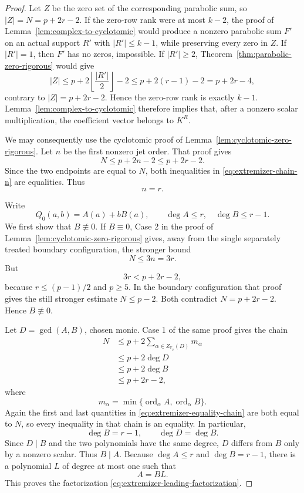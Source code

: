 \documentclass[11pt]{article}
\newcommand{\F}{\mathbb F}
\begin{document}
\begin{proof}
Let \(Z\) be the zero set of the corresponding parabolic sum, so
\(|Z|=N=p+2r-2\).  If the zero-row rank were at most \(k-2\), the proof
of Lemma~\ref{lem:complex-to-cyclotomic} would produce a nonzero
parabolic sum \(F'\) on an actual support \(R'\) with
\(|R'|\le k-1\), while preserving every zero in \(Z\).  If
\(|R'|=1\), then \(F'\) has no zeros, impossible.  If \(|R'|\ge2\),
Theorem~\ref{thm:parabolic-zero-rigorous} would give
\[
 |Z|
 \le
 p+2\left\lfloor\frac{|R'|}{2}\right\rfloor-2
 \le
 p+2(r-1)-2
 =p+2r-4,
\]
contrary to \(|Z|=p+2r-2\).  Hence the zero-row rank is exactly
\(k-1\).  Lemma~\ref{lem:complex-to-cyclotomic} therefore implies that,
after a nonzero scalar multiplication, the coefficient vector belongs
to \(K^R\).

We may consequently use the cyclotomic proof of
Lemma~\ref{lem:cyclotomic-zero-rigorous}.  Let \(n\) be the first
nonzero jet order.  That proof gives
\begin{equation}
 N\le p+2n-2
 \le p+2r-2.
 \label{eq:extremizer-chain-n}
\end{equation}
Since the two endpoints are equal to \(N\), both inequalities in
\eqref{eq:extremizer-chain-n} are equalities.  Thus
\begin{equation}
 n=r.
 \label{eq:extremizer-n-r}
\end{equation}

Write
\[
 Q_0(a,b)=A(a)+bB(a),
 \qquad
 \deg A\le r,
 \quad
 \deg B\le r-1.
\]
We first show that \(B\not\equiv0\).  If \(B\equiv0\), Case 2 in the
proof of Lemma~\ref{lem:cyclotomic-zero-rigorous} gives, away from the
single separately treated boundary configuration, the stronger bound
\[
 N\le3n=3r.
\]
But
\[
 3r<p+2r-2,
\]
because \(r\le(p-1)/2\) and \(p\ge5\).  In the boundary configuration
that proof gives the still stronger estimate \(N\le p-2\).  Both
contradict \(N=p+2r-2\).  Hence \(B\not\equiv0\).

Let \(D=\gcd(A,B)\), chosen monic.  Case 1 of the same proof gives the
chain
\begin{equation}
 \begin{aligned}
 N
 &\le
 p+2\sum_{\alpha\in Z_{\F_p}(D)}m_\alpha\\
 &\le p+2\deg D\\
 &\le p+2\deg B\\
 &\le p+2r-2,
 \end{aligned}
 \label{eq:extremizer-equality-chain}
\end{equation}
where
\[
 m_\alpha=
 \min\{\operatorname{ord}_\alpha A,
        \operatorname{ord}_\alpha B\}.
\]
Again the first and last quantities in
\eqref{eq:extremizer-equality-chain} are both equal to \(N\), so every
inequality in that chain is an equality.  In particular,
\begin{equation}
 \deg B=r-1,
 \qquad
 \deg D=\deg B.
 \label{eq:extremizer-degrees}
\end{equation}
Since \(D\mid B\) and the two polynomials have the same degree,
\(D\) differs from \(B\) only by a nonzero scalar.  Thus \(B\mid A\).
Because \(\deg A\le r\) and \(\deg B=r-1\), there is a polynomial
\(L\) of degree at most one such that
\[
 A=BL.
\]
This proves the factorization
\eqref{eq:extremizer-leading-factorization}.


\end{proof}
\end{document}
